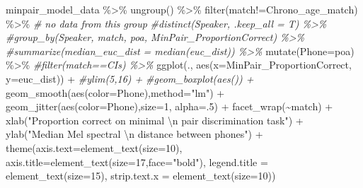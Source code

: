 \documentclass[
]{article}
\newenvironment{Shaded}{\begin{snugshade}}{\end{snugshade}}
\newcommand{\AttributeTok}[1]{\textcolor[rgb]{0.77,0.63,0.00}{#1}}
\newcommand{\CommentTok}[1]{\textcolor[rgb]{0.56,0.35,0.01}{\textit{#1}}}
\newcommand{\DecValTok}[1]{\textcolor[rgb]{0.00,0.00,0.81}{#1}}
\newcommand{\FunctionTok}[1]{\textcolor[rgb]{0.00,0.00,0.00}{#1}}
\newcommand{\NormalTok}[1]{#1}
\newcommand{\SpecialCharTok}[1]{\textcolor[rgb]{0.00,0.00,0.00}{#1}}
\newcommand{\StringTok}[1]{\textcolor[rgb]{0.31,0.60,0.02}{#1}}
\begin{document}
\begin{Shaded}
\begin{Highlighting}[]
\NormalTok{ minpair\_model\_data }\SpecialCharTok{\%\textgreater{}\%}
   \FunctionTok{ungroup}\NormalTok{() }\SpecialCharTok{\%\textgreater{}\%}
  \FunctionTok{filter}\NormalTok{(match}\SpecialCharTok{!=}\StringTok{\textquotesingle{}Chrono\_age\_match\textquotesingle{}}\NormalTok{) }\SpecialCharTok{\%\textgreater{}\%} \CommentTok{\# no data from this group}
   \CommentTok{\#distinct(Speaker, .keep\_all = T) \%\textgreater{}\%}
  \CommentTok{\#group\_by(Speaker, match, poa, MinPair\_ProportionCorrect) \%\textgreater{}\%}
  \CommentTok{\#summarize(median\_euc\_dist = median(euc\_dist)) \%\textgreater{}\%}
  \FunctionTok{mutate}\NormalTok{(}\AttributeTok{Phone=}\NormalTok{poa) }\SpecialCharTok{\%\textgreater{}\%}
  \CommentTok{\#filter(match==\textquotesingle{}CIs\textquotesingle{}) \%\textgreater{}\%}
  \FunctionTok{ggplot}\NormalTok{(., }\FunctionTok{aes}\NormalTok{(}\AttributeTok{x=}\NormalTok{MinPair\_ProportionCorrect, }\AttributeTok{y=}\NormalTok{euc\_dist)) }\SpecialCharTok{+} 
  \CommentTok{\#ylim(5,16) + }
  \CommentTok{\#geom\_boxplot(aes()) + }
  \FunctionTok{geom\_smooth}\NormalTok{(}\FunctionTok{aes}\NormalTok{(}\AttributeTok{color=}\NormalTok{Phone),}\AttributeTok{method=}\StringTok{"lm"}\NormalTok{) }\SpecialCharTok{+} 
   \FunctionTok{geom\_jitter}\NormalTok{(}\FunctionTok{aes}\NormalTok{(}\AttributeTok{color=}\NormalTok{Phone),}\AttributeTok{size=}\DecValTok{1}\NormalTok{, }\AttributeTok{alpha=}\NormalTok{.}\DecValTok{5}\NormalTok{) }\SpecialCharTok{+}
  \FunctionTok{facet\_wrap}\NormalTok{(}\SpecialCharTok{\textasciitilde{}}\NormalTok{match) }\SpecialCharTok{+}
  \FunctionTok{xlab}\NormalTok{(}\StringTok{"Proportion correct on minimal }\SpecialCharTok{\textbackslash{}n}\StringTok{ pair discrimination task"}\NormalTok{) }\SpecialCharTok{+} 
  \FunctionTok{ylab}\NormalTok{(}\StringTok{"Median Mel spectral }\SpecialCharTok{\textbackslash{}n}\StringTok{ distance between phones"}\NormalTok{) }\SpecialCharTok{+} 
  \FunctionTok{theme}\NormalTok{(}\AttributeTok{axis.text=}\FunctionTok{element\_text}\NormalTok{(}\AttributeTok{size=}\DecValTok{10}\NormalTok{),}
      \AttributeTok{axis.title=}\FunctionTok{element\_text}\NormalTok{(}\AttributeTok{size=}\DecValTok{17}\NormalTok{,}\AttributeTok{face=}\StringTok{"bold"}\NormalTok{),}
      \AttributeTok{legend.title =} \FunctionTok{element\_text}\NormalTok{(}\AttributeTok{size=}\DecValTok{15}\NormalTok{),}
      \AttributeTok{strip.text.x =} \FunctionTok{element\_text}\NormalTok{(}\AttributeTok{size=}\DecValTok{10}\NormalTok{)) }
\end{Highlighting}
\end{Shaded}
\end{document}
